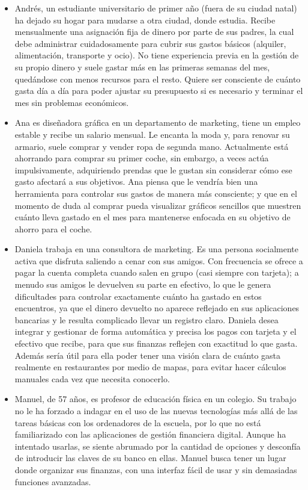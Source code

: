\begin{itemize}
    \item Andrés, un estudiante universitario de primer año (fuera de su ciudad natal) ha dejado su hogar para mudarse a otra ciudad, donde estudia. Recibe mensualmente una asignación fija de dinero por parte de sus padres, la cual debe administrar cuidadosamente para cubrir sus gastos básicos (alquiler, alimentación, transporte y ocio). No tiene experiencia previa en la gestión de su propio dinero y suele gastar más en las primeras semanas del mes, quedándose con menos recursos para el resto. Quiere ser consciente de cuánto gasta día a día para poder ajustar su presupuesto si es necesario y terminar el mes sin problemas económicos. \\

    \item Ana es diseñadora gráfica en un departamento de marketing, tiene un empleo estable y recibe un salario mensual. Le encanta la moda y, para renovar su armario, suele comprar y vender ropa de segunda mano. Actualmente está ahorrando para comprar su primer coche, sin embargo, a veces actúa impulsivamente, adquiriendo prendas que le gustan sin considerar cómo ese gasto afectará a sus objetivos. Ana piensa que le vendría bien una herramienta para controlar sus gastos de manera más consciente; y que en el momento de duda al comprar pueda visualizar gráficos sencillos que muestren cuánto lleva gastado en el mes para mantenerse enfocada en su objetivo de ahorro para el coche. \\
    
    \item Daniela trabaja en una consultora de marketing. Es una persona socialmente activa que disfruta saliendo a cenar con sus amigos. Con frecuencia se ofrece a pagar la cuenta completa cuando salen en grupo (casi siempre con tarjeta); a menudo sus amigos le devuelven su parte en efectivo, lo que le genera dificultades para controlar exactamente cuánto ha gastado en estos encuentros, ya que el dinero devuelto no aparece reflejado en sus aplicaciones bancarias y le resulta complicado llevar un registro claro. Daniela desea integrar y gestionar de forma automática y precisa los pagos con tarjeta y el efectivo que recibe, para que sus finanzas reflejen con exactitud lo que gasta. Además sería útil para ella poder tener una visión clara de cuánto gasta realmente en restaurantes por medio de mapas, para evitar hacer cálculos manuales cada vez que necesita conocerlo. \\
    
    \item Manuel, de 57 años, es profesor de educación física en un colegio. Su trabajo no le ha forzado a indagar en el uso de las nuevas tecnologías más allá de las tareas básicas con los ordenadores de la escuela, por lo que no está familiarizado con las aplicaciones de gestión financiera digital. Aunque ha intentado usarlas, se siente abrumado por la cantidad de opciones y desconfía de introducir las claves de su banco en ellas. Manuel busca tener un lugar donde organizar sus finanzas, con una interfaz fácil de usar y sin demasiadas funciones avanzadas.
    
\end{itemize}

